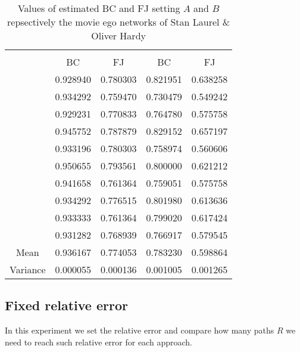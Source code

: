 		 \begin{table}[h]
		 	\centering
		 	\begin{tabular}{l|l|l|l|l|}
		 		\cline{2-5}
		 		&\multicolumn{2}{c|}{\fsamp} & \multicolumn{2}{c|}{\base}\\
		 		\cline{2-5}
		 		& \multicolumn{1}{c|}{BC} & \multicolumn{1}{c|}{FJ} & \multicolumn{1}{c|}{BC} & \multicolumn{1}{c|}{FJ}\\
		 		\cline{2-5}
		 		& 0.928940 & 0.780303 &  0.821951 & 0.638258\\
		 		& 0.934292 & 0.759470 &  0.730479 & 0.549242\\
		 		& 0.929231 & 0.770833 &  0.764780 & 0.575758\\
		 		& 0.945752 & 0.787879 &  0.829152 & 0.657197\\
		 		& 0.933196 & 0.780303 &  0.758974 & 0.560606\\
		 		& 0.950655 & 0.793561 &  0.800000 & 0.621212\\
		 		& 0.941658 & 0.761364 &  0.759051 & 0.575758\\
		 		& 0.934292 & 0.776515 &  0.801980 & 0.613636\\
		 		& 0.933333 & 0.761364 &  0.799020 & 0.617424\\
		 		& 0.931282 & 0.768939 &  0.766917 & 0.579545\\
		 		\hline
		 		\multicolumn{1}{|c|}{Mean} & 0.936167 & 0.774053 & 0.783230 & 0.598864\\
		 		\multicolumn{1}{|c|}{Variance} & 0.000055 & 0.000136 & 0.001005 & 0.001265\\
		 		\hline  %
		 	\end{tabular}
		 	\caption{Values of estimated BC and FJ setting $A$ and $B$ repsectively the movie ego networks of Stan Laurel \& Oliver Hardy }
		 	\label{table:stanlio}
		 \end{table}
	\subsection*{Fixed relative error}
	
	In this experiment we set the relative error and compare how many paths $R$ we need to reach such relative error for each approach.\\
	
